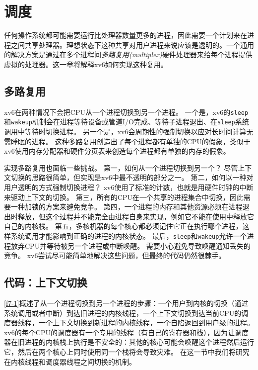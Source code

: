 \chapter{调度}\label{ch07}

任何操作系统都可能需要运行比处理器数量更多的进程，因此需要一个计划来在进程之间共享处理器。理想状态下这种共享对用户进程来说应该是透明的。一个通用的解决方案是通过在多个进程间\emph{多路复用(multiplex)}硬件处理器来给每个进程提供虚拟的处理器。这一章将解释xv6如何实现这种复用。

\section{多路复用}
xv6在两种情况下会把CPU从一个进程切换到另一个进程。
一个是，xv6的\texttt{sleep}和\texttt{wakeup}机制会在进程等待设备或管道I/O完成、等待子进程退出、在\texttt{sleep}系统调用中等待时切换进程。
另一个是，xv6会周期性的强制切换以应对长时间计算无需睡眠的进程。
这种多路复用创造出了每个进程都有单独的CPU的假象，类似于xv6使用内存分配器和硬件分页表来创造每个进程都有单独的内存的假象。

实现多路复用也面临一些挑战。
第一，如何从一个进程切换到另一个？
尽管上下文切换的思路很简单，但实现是xv6中最不透明的部分之一。
第二，如何以一种对用户透明的方式强制切换进程？
xv6使用了标准的计数，也就是用硬件时钟的中断来驱动上下文的切换。
第三，所有的CPU在一个共享的进程集合中切换，因此需要一种加锁的方案来避免竞争。
第四，一个进程的内存和其他资源必须在进程退出时释放，但这个过程并不能完全由进程自身来实现，例如它不能在使用中释放它自己的内核栈。
第五，多核机器的每个核心都必须记住它正在执行哪个进程，这样系统调用才能影响到正确的进程的内核状态。
最后，\texttt{sleep}和\texttt{wakeup}允许一个进程放弃CPU并等待被另一个进程或中断唤醒。
需要小心避免导致唤醒通知丢失的竞争。
xv6尝试尽可能简单地解决这些问题，但最终的代码仍然很棘手。

\section{代码：上下文切换}
\autoref{f7-1}概述了从一个进程切换到另一个进程的步骤：一个用户到内核的切换（通过系统调用或者中断）到达旧进程的内核线程，一个上下文切换到达当前CPU的调度器线程，一个上下文切换到新进程的内核线程，一个自陷返回到用户级的进程。
xv6的每个CPU的调度器有一个专用的线程（有自己的寄存器和栈），因为让调度器在旧进程的内核栈上执行是不安全的：其他的核心可能会唤醒这个进程然后运行它，然后在两个核心上同时使用同一个栈将会导致灾难。
在这一节中我们将研究在内核线程和调度器线程之间切换的机制。


